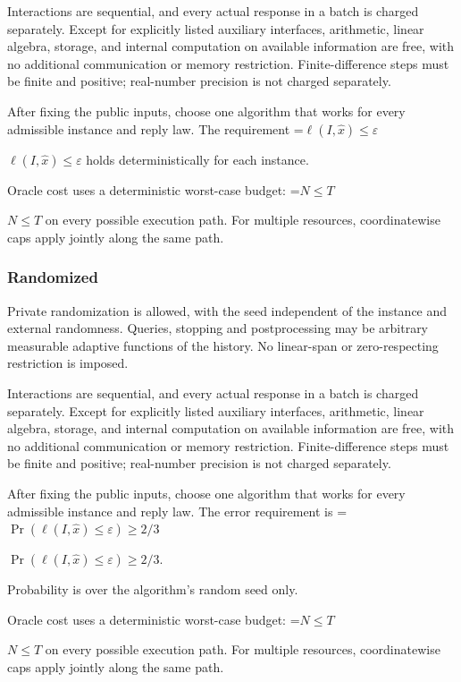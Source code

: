 \documentclass[10pt,a4paper]{article}
\newcommand{\AtlasMath}[1]{\par\begingroup\centering\setbox0=\hbox{$\displaystyle #1$}\ifdim\wd0>1.4\linewidth\typeout{ATLAS WIDE FORMULA: \the\wd0}\fi\ifdim\wd0>\linewidth\resizebox{\linewidth}{!}{\box0}\else\box0\fi\par\endgroup}
\newcommand{\AtlasInlineMath}[1]{\begingroup\setbox0=\hbox{$#1$}\ifdim\wd0>.4\linewidth\endgroup\AtlasMath{#1}\else\endgroup$#1$\fi}
\begin{document}
Interactions are sequential, and every actual response in a batch is charged separately. Except for explicitly listed auxiliary interfaces, arithmetic, linear algebra, storage, and internal computation on available information are free, with no additional communication or memory restriction. Finite-difference steps must be finite and positive; real-number precision is not charged separately.



After fixing the public inputs, choose one algorithm that works for every admissible instance and reply law. The requirement \AtlasInlineMath{\ell(I,\widehat{x})\le \varepsilon} holds deterministically for each instance.



Oracle cost uses a deterministic worst-case budget: \AtlasInlineMath{N\le T} on every possible execution path. For multiple resources, coordinatewise caps apply jointly along the same path.



\subsubsection{Randomized}


Private randomization is allowed, with the seed independent of the instance and external randomness. Queries, stopping and postprocessing may be arbitrary measurable adaptive functions of the history. No linear-span or zero-respecting restriction is imposed.



Interactions are sequential, and every actual response in a batch is charged separately. Except for explicitly listed auxiliary interfaces, arithmetic, linear algebra, storage, and internal computation on available information are free, with no additional communication or memory restriction. Finite-difference steps must be finite and positive; real-number precision is not charged separately.



After fixing the public inputs, choose one algorithm that works for every admissible instance and reply law. The error requirement is \AtlasInlineMath{\Pr(\ell(I,\widehat{x})\le \varepsilon)\ge2/3}.



Probability is over the algorithm's random seed only.



Oracle cost uses a deterministic worst-case budget: \AtlasInlineMath{N\le T} on every possible execution path. For multiple resources, coordinatewise caps apply jointly along the same path.
\end{document}
